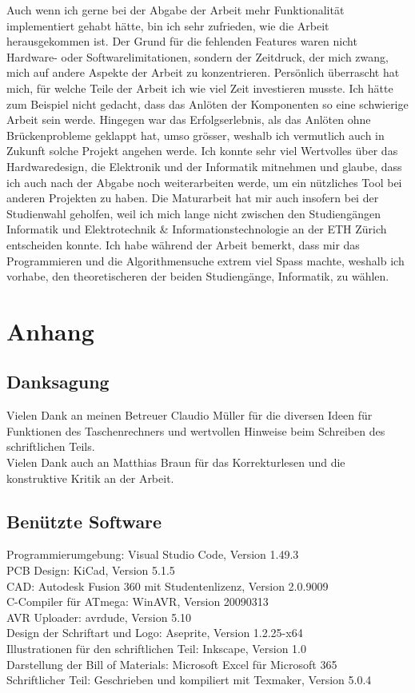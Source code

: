 \documentclass[12pt, a4paper]{report}
\begin{document}
Auch wenn ich gerne bei der Abgabe der Arbeit mehr Funktionalität implementiert gehabt hätte, bin ich sehr zufrieden, wie die Arbeit herausgekommen ist. Der Grund für die fehlenden Features waren nicht Hardware- oder Softwarelimitationen, sondern der Zeitdruck, der mich zwang, mich auf andere Aspekte der Arbeit zu konzentrieren. Persönlich überrascht hat mich, für welche Teile der Arbeit ich wie viel Zeit investieren musste. Ich hätte zum Beispiel nicht gedacht, dass das Anlöten der Komponenten so eine schwierige Arbeit sein werde. Hingegen war das Erfolgserlebnis, als das Anlöten ohne Brückenprobleme geklappt hat, umso grösser, weshalb ich vermutlich auch in Zukunft solche Projekt angehen werde. Ich konnte sehr viel Wertvolles über das Hardwaredesign, die Elektronik und der Informatik mitnehmen und glaube, dass ich auch nach der Abgabe noch weiterarbeiten werde, um ein nützliches Tool bei anderen Projekten zu haben. Die Maturarbeit hat mir auch insofern bei der Studienwahl geholfen, weil ich mich lange nicht zwischen den Studiengängen Informatik und Elektrotechnik \& Informationstechnologie an der ETH Zürich entscheiden konnte. Ich habe während der Arbeit bemerkt, dass mir das Programmieren und die Algorithmensuche extrem viel Spass machte, weshalb ich vorhabe, den theoretischeren der beiden Studiengänge, Informatik, zu wählen.
\chapter{Anhang}
\section{Danksagung}
Vielen Dank an meinen Betreuer Claudio Müller für die diversen Ideen für Funktionen des Taschenrechners und wertvollen Hinweise beim Schreiben des schriftlichen Teils.\\
Vielen Dank auch an Matthias Braun für das Korrekturlesen und die konstruktive Kritik an der Arbeit.
\section{Benützte Software}
Programmierumgebung: Visual Studio Code, Version 1.49.3 \\
PCB Design: KiCad, Version 5.1.5 \\
CAD: Autodesk Fusion 360 mit Studentenlizenz, Version 2.0.9009 \\
C-Compiler für ATmega: WinAVR, Version 20090313 \\
AVR Uploader: avrdude, Version 5.10 \\
Design der Schriftart und Logo: Aseprite, Version 1.2.25-x64 \\
Illustrationen für den schriftlichen Teil: Inkscape, Version 1.0 \\
Darstellung der Bill of Materials: Microsoft Excel für Microsoft 365 \\
Schriftlicher Teil: Geschrieben und kompiliert mit Texmaker, Version 5.0.4
\end{document}
